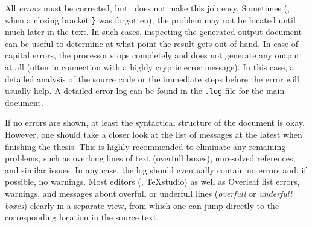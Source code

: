 \noindent
All \emph{errors} must be corrected, but \latex\ does not make this job easy.
Sometimes (\eg, when a closing bracket \verb!}! was forgotten), the problem may
not be located until much later in the text. In such cases, inspecting the
generated output document can be useful to determine at what point the result
gets out of hand. In case of capital errors, the \latex processor stops
completely and does not generate any output at all (often in connection with a highly
cryptic error message). In this case, a detailed analysis of the source code or
the immediate steps before the error will usually help. A detailed error log can be
found in the \verb!.log! file for the main document.

If no errors are shown, at least the syntactical structure of the document is
okay. However, one should take a closer look at the list of messages at the
latest when finishing the thesis. This is highly recommended to eliminate any
remaining problems, such as overlong lines of text (overfull boxes), unresolved
references, and similar issues. In any case, the log should eventually contain no
errors and, if possible, no warnings. Most editors (\eg, \textsf{TeXstudio}) as
well as \textsf{Overleaf} list errors, warnings, and messages about overfull or
underfull lines (\emph{overfull} or \emph{underfull boxes}) clearly in a
separate view, from which one can jump directly to the corresponding location
in the source text. 


